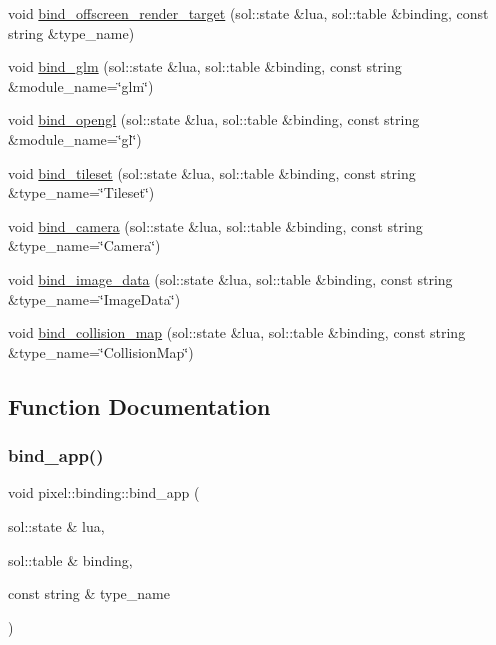 \begin{DoxyCompactItemize}
\item 
void \hyperlink{namespacepixel_1_1binding_a9486ccd069276d9bdc7b4efda484c020}{bind\+\_\+offscreen\+\_\+render\+\_\+target} (sol\+::state \&lua, sol\+::table \&binding, const string \&type\+\_\+name)
\item 
void \hyperlink{namespacepixel_1_1binding_a2a97de4cd72e526976d52014036bb423}{bind\+\_\+glm} (sol\+::state \&lua, sol\+::table \&binding, const string \&module\+\_\+name=\char`\"{}glm\char`\"{})
\item 
void \hyperlink{namespacepixel_1_1binding_aba74c7113476d1ba0aeaf6d396ccc7b0}{bind\+\_\+opengl} (sol\+::state \&lua, sol\+::table \&binding, const string \&module\+\_\+name=\char`\"{}gl\char`\"{})
\item 
void \hyperlink{namespacepixel_1_1binding_af8bd42a777032db179b42a8cbf5d26df}{bind\+\_\+tileset} (sol\+::state \&lua, sol\+::table \&binding, const string \&type\+\_\+name=\char`\"{}Tileset\char`\"{})
\item 
void \hyperlink{namespacepixel_1_1binding_a5229f3770ff8aa6b35955c6ec565fd23}{bind\+\_\+camera} (sol\+::state \&lua, sol\+::table \&binding, const string \&type\+\_\+name=\char`\"{}Camera\char`\"{})
\item 
void \hyperlink{namespacepixel_1_1binding_ab1d6b8f35766477a2a49cdb658f8e799}{bind\+\_\+image\+\_\+data} (sol\+::state \&lua, sol\+::table \&binding, const string \&type\+\_\+name=\char`\"{}Image\+Data\char`\"{})
\item 
void \hyperlink{namespacepixel_1_1binding_a8cd7af28e7ef023bdc6d2868961e9614}{bind\+\_\+collision\+\_\+map} (sol\+::state \&lua, sol\+::table \&binding, const string \&type\+\_\+name=\char`\"{}Collision\+Map\char`\"{})
\end{DoxyCompactItemize}


\subsection{Function Documentation}
\mbox{\label{namespacepixel_1_1binding_a3d31a63c2925c5124d5d56a564d21d74}} 
\subsubsection{\texorpdfstring{bind\+\_\+app()}{bind\_app()}}
{\footnotesize\ttfamily void pixel\+::binding\+::bind\+\_\+app (\begin{DoxyParamCaption}\item[{sol\+::state \&}]{lua,  }\item[{sol\+::table \&}]{binding,  }\item[{const string \&}]{type\+\_\+name }\end{DoxyParamCaption})}

